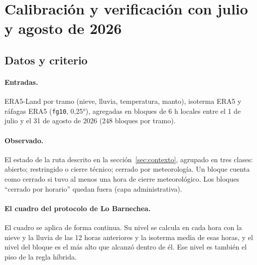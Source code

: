 
\section{Calibración y verificación con julio y agosto de 2026}\label{sec:calibracion}\label{sec:resultados}

\subsection{Datos y criterio}

\paragraph{Entradas.} ERA5-Land por tramo (nieve, lluvia, temperatura, manto), isoterma ERA5 y ráfagas ERA5 (\texttt{fg10}, 0,25°), agregadas en bloques de 6 h locales entre el 1 de julio y el 31 de agosto de 2026 (248 bloques por tramo).

\paragraph{Observado.} El estado de la ruta descrito en la sección~\ref{sec:contexto}, agrupado en tres clases: abierto; restringido o cierre técnico; cerrado por meteorología. Un bloque cuenta como cerrado si tuvo al menos una hora de cierre meteorológico. Los bloques ``cerrado por horario'' quedan fuera (capa administrativa).

\paragraph{El cuadro del protocolo de Lo Barnechea.} El cuadro se aplica de forma continua. Su nivel se calcula en cada hora con la nieve y la lluvia de las 12 horas anteriores y la isoterma media de esas horas, y el nivel del bloque es el más alto que alcanzó dentro de él. Ese nivel es también el piso de la regla híbrida.

